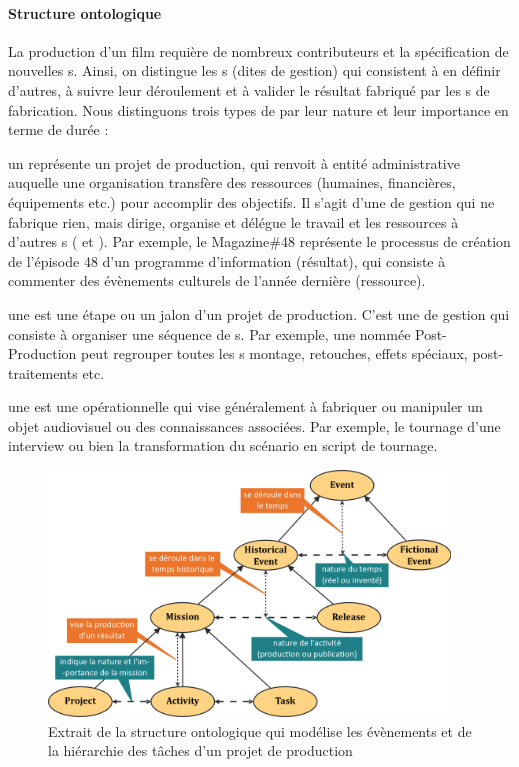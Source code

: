 \paragraph{Structure ontologique} 
La production d'un film requière de nombreux contributeurs et la spécification de nouvelles s.
Ainsi, on distingue les s (dites de gestion) qui consistent à en définir d'autres, à suivre leur déroulement et à valider le résultat fabriqué par les s de fabrication. 
Nous distinguons trois types de  par leur nature et leur importance en terme de durée : 
\begin{liste}
	\item un  représente un projet de production, qui renvoit à entité administrative auquelle une organisation transfère des ressources (humaines, financières, équipements etc.) pour accomplir des objectifs. 
	Il s'agit d'une  de gestion qui ne fabrique rien, mais dirige, organise et délégue le travail et les ressources à d'autres s ( et ).
	Par exemple, le  Magazine\#48 représente le processus de création de l'épisode 48 d'un programme d'information (résultat), qui consiste à commenter des évènements culturels de l'année dernière (ressource).

	\item une  est une étape ou un jalon d'un projet de production. 
	C'est une  de gestion qui consiste à organiser une séquence de s.
	Par exemple, une  nommée Post-Production peut regrouper toutes les s montage, retouches, effets spéciaux, post-traitements etc.

	\item une  est une  opérationnelle qui vise généralement à fabriquer ou manipuler un objet audiovisuel ou des connaissances associées.
	Par exemple, le tournage d'une interview ou bien la transformation du scénario en script de tournage. 
\end{liste}

\begin{figure}[ht!]
\centering
\includegraphics[width=0.95\textwidth]{./images/SO-Event-v1.png}
\caption{Extrait de la structure ontologique qui modélise les évènements et de la hiérarchie des tâches d'un projet de production}
\label{img:so-event}
\end{figure}


